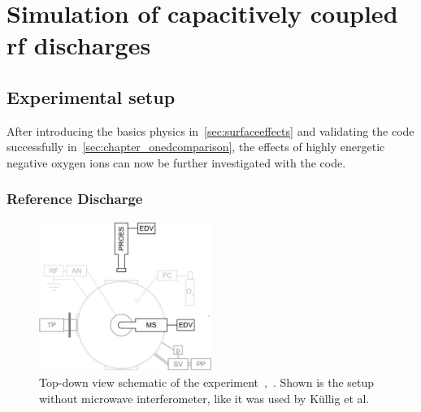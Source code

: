 %
\chapter{Simulation of capacitively coupled rf discharges}\label{sec:chapter_twodccrf}
%
	\section{Experimental setup}\label{sec:twod_setup}
%
		After introducing the basics physics in~\autoref{sec:surfaceeffects} and validating the code successfully in~\autoref{sec:chapter_onedcomparison}, the effects of highly energetic negative oxygen ions can now be further investigated with the code.
%
		\subsection{Reference Discharge}\label{sec:reference_dis}
%
			\begin{figure}[b!]
				\centering
				\includegraphics[width=0.5\textwidth]{figures/chamber_exp.pdf}
				\caption{%
					Top-down view schematic of the experiment~\cite{Scheuer15},~\cite{Kullig12}. Shown is the setup %
					without microwave interferometer, like it was used by Küllig et al.}\label{fig:discharge_chamber}
			\end{figure}
%
